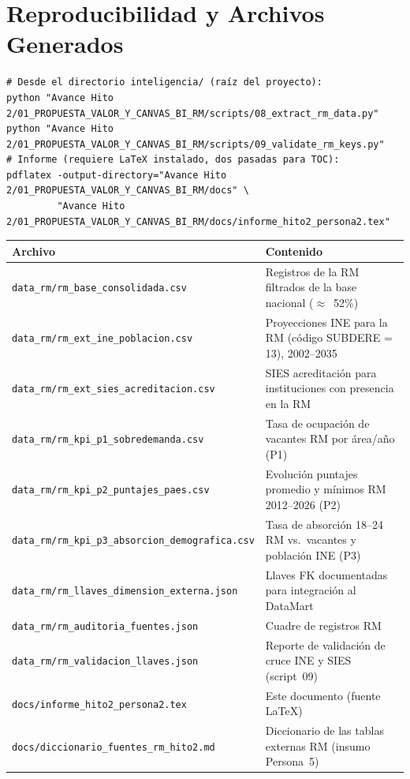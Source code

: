 \documentclass[11pt,a4paper]{article}
\begin{document}
\appendix
\section{Reproducibilidad y Archivos Generados}

\begin{lstlisting}
# Desde el directorio inteligencia/ (raíz del proyecto):
python "Avance Hito 2/01_PROPUESTA_VALOR_Y_CANVAS_BI_RM/scripts/08_extract_rm_data.py"
python "Avance Hito 2/01_PROPUESTA_VALOR_Y_CANVAS_BI_RM/scripts/09_validate_rm_keys.py"
# Informe (requiere LaTeX instalado, dos pasadas para TOC):
pdflatex -output-directory="Avance Hito 2/01_PROPUESTA_VALOR_Y_CANVAS_BI_RM/docs" \
         "Avance Hito 2/01_PROPUESTA_VALOR_Y_CANVAS_BI_RM/docs/informe_hito2_persona2.tex"
\end{lstlisting}

\begin{center}
\small
\begin{tabularx}{\textwidth}{@{}lY@{}}
\toprule
\textbf{Archivo} & \textbf{Contenido} \\
\midrule
\texttt{data\_rm/rm\_base\_consolidada.csv} &
  Registros de la RM filtrados de la base nacional ($\approx$~52\%) \\
\texttt{data\_rm/rm\_ext\_ine\_poblacion.csv} &
  Proyecciones INE para la RM (código SUBDERE = 13), 2002--2035 \\
\texttt{data\_rm/rm\_ext\_sies\_acreditacion.csv} &
  SIES acreditación para instituciones con presencia en la RM \\
\texttt{data\_rm/rm\_kpi\_p1\_sobredemanda.csv} &
  Tasa de ocupación de vacantes RM por área/año (P1) \\
\texttt{data\_rm/rm\_kpi\_p2\_puntajes\_paes.csv} &
  Evolución puntajes promedio y mínimos RM 2012--2026 (P2) \\
\texttt{data\_rm/rm\_kpi\_p3\_absorcion\_demografica.csv} &
  Tasa de absorción 18--24 RM vs.\ vacantes y población INE (P3) \\
\texttt{data\_rm/rm\_llaves\_dimension\_externa.json} &
  Llaves FK documentadas para integración al DataMart \\
\texttt{data\_rm/rm\_auditoria\_fuentes.json} &
  Cuadre de registros RM \\
\texttt{data\_rm/rm\_validacion\_llaves.json} &
  Reporte de validación de cruce INE y SIES (script~09) \\
\texttt{docs/informe\_hito2\_persona2.tex} &
  Este documento (fuente \LaTeX) \\
\texttt{docs/diccionario\_fuentes\_rm\_hito2.md} &
  Diccionario de las tablas externas RM (insumo Persona~5) \\
\bottomrule
\end{tabularx}
\end{center}
\end{document}
